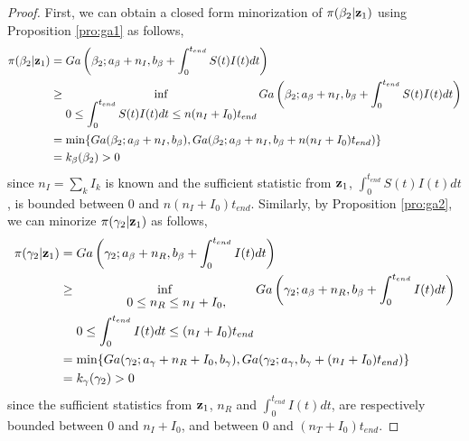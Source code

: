 \documentclass[11pt]{article}
\begin{document}
\begin{proof}
		First, we can obtain a closed form minorization of $\pi(\beta_2| \mathbf{z}_1)$ using Proposition \ref{pro:ga1} as follows,
		\begin{align*}
			\pi(\beta_2| \mathbf{z}_1) 
			& = Ga\left(\beta_2; a_{\beta} + n_I, b_{\beta} + \int_{0}^{t_{end}}S(t)I(t)dt\right) \\
			& \ge \inf_{\begin{aligned}
				 0\le \int_{0}^{t_{end}} S(t)I(t)dt \le n(n_I+I_0) t_{end}
		\end{aligned}}   Ga\left(\beta_2; a_{\beta} + n_I, b_{\beta} + \int_{0}^{t_{end}}S(t)I(t)dt\right) \\
			& = \min\{Ga(\beta_2;a_{\beta}+n_I, b_{\beta}), Ga(\beta_2;a_{\beta}+n_I,b_{\beta}+n(n_I+I_0) t_{end})\} \\
			& = k_\beta(\beta_2) > 0
		\end{align*}
		since $n_I = \sum_k I_k$ is known and the sufficient statistic from $\mathbf{z}_1$, 
		$\int_{0}^{t_{end}}S(t)I(t)dt$, is bounded between $0$ and $n (n_I+I_0)t_{end}$. Similarly, by Proposition \ref{pro:ga2}, we can minorize $\pi(\gamma_2| \mathbf{z}_1)$ as follows,
		\begin{align*}
			\pi(\gamma_2| \mathbf{z}_1) 
			& = Ga\left(\gamma_2; a_{\beta} + n_R, b_{\beta} + \int_{0}^{t_{end}}I(t)dt\right)  \\
			& \ge \inf_{\begin{aligned}
				 0 \le n_R &\le n_I + I_0, \\
				 0 \le \int_{0}^{t_{end}} I(t)dt &\le (n_I+I_0) t_{end}
		\end{aligned}} Ga\left(\gamma_2; a_{\beta} + n_R, b_{\beta} + \int_{0}^{t_{end}}I(t)dt\right) \\
			& = \min\{		Ga(\gamma_2;a_{\gamma}+n_R+I_0,b_{\gamma}), Ga(\gamma_2;a_{\gamma},b_{\gamma}+(n_I+I_0) t_{end})\} \\
			& = k_\gamma(\gamma_2) > 0
		\end{align*}
		since the sufficient statistics from $\mathbf{z}_1$, $n_R$ and $\int_{0}^{t_{end}}I(t)dt$, are respectively bounded between $0$ and $n_I + I_0$, and between $0$ and $(n_T+I_0) t_{end}$.
		

\end{proof}
\end{document}
